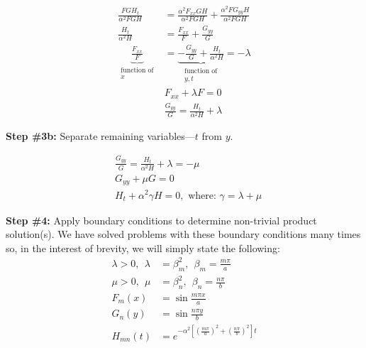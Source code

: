 \begin{align*}
\frac{FGH_t}{\alpha^2 FGH} &= \frac{\alpha^2 F_{xx}GH}{\alpha^2 FGH} + \frac{\alpha^2 FG_{yy}H}{\alpha^2 FGH} \\
\frac{H_t}{\alpha^2 H} &= \frac{F_{xx}}{F} + \frac{G_{yy}}{G} \\
\underbrace{\frac{F_{xx}}{F}}_{\substack{\text{function of} \\ x}} &= \underbrace{-\frac{G_{yy}}{G} + \frac{H_{t}}{\alpha^2 H}}_{\substack{\text{function of} \\ y,t}} = -\lambda \\
&F_{xx} + \lambda F = 0 \\
&\frac{G_{yy}}{G} = \frac{H_{t}}{\alpha^2 H} + \lambda
\end{align*}
\vspace{0.25cm}

\noindent\textbf{Step \#3b:} Separate remaining variables---$t$ from $y$.

\begin{align*}
&\frac{G_{yy}}{G} = \frac{H_{t}}{\alpha^2 H} + \lambda = -\mu \\
&G_{yy} + \mu G = 0 \\
&H_{t} + \alpha^2\gamma H = 0, \text{ where: } \gamma = \lambda + \mu
\end{align*}

\noindent\textbf{Step \#4:} Apply boundary conditions to determine non-trivial product solution(s).
We have solved problems with these boundary conditions many times so, in the interest of brevity, we will simply state the following:
\begin{align*}
\lambda > 0, \ \ \lambda &= \beta_{m}^2, \ \ \beta_m = \frac{m \pi}{a} \\
\mu>0, \ \ \mu &= \beta_n^2, \ \ \beta_n = \frac{n \pi}{b} \\
F_m(x) &= \sin{\frac{m \pi x}{a}} \\
G_n(y) &= \sin{\frac{n \pi y}{b}} \\
H_{mn}(t) &= e^{-\alpha^2\left[\left(\frac{m \pi}{a}\right)^2 + \left(\frac{n \pi}{b} \right)^2 \right]t} 
\end{align*}
\vspace{0.25cm}

